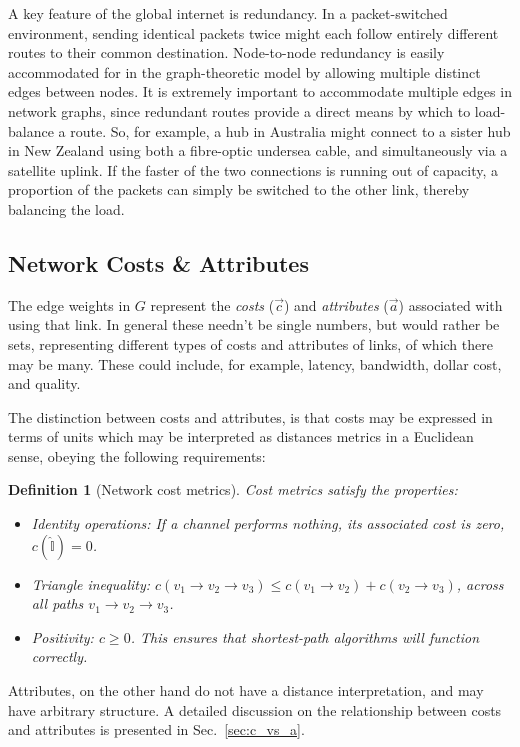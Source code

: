 \documentclass[aps,rmp,twocolumn,amsmath,amssymb,nofootinbib,superscriptaddress]{revtex4}
\newtheorem{definition}{Definition}
\begin{document}
A key feature of the global internet is redundancy. In a packet-switched \cite{???} environment, sending identical packets twice might each follow entirely different routes to their common destination. Node-to-node redundancy is easily accommodated for in the graph-theoretic model by allowing multiple distinct edges between nodes. It is extremely important to accommodate multiple edges in network graphs, since redundant routes provide a direct means by which to load-balance a route. So, for example, a hub in Australia might connect to a sister hub in New Zealand using both a fibre-optic undersea cable, and simultaneously via a satellite uplink. If the faster of the two connections is running out of capacity, a proportion of the packets can simply be switched to the other link, thereby balancing the load.

%
%

\subsection{Network Costs \& Attributes} \label{sec:costs}

The edge weights in $G$ represent the \emph{costs} ($\vec c$) and \emph{attributes} ($\vec a$) associated with using that link. In general these needn't be single numbers, but would rather be sets, representing different types of costs and attributes of links, of which there may be many. These could include, for example, latency, bandwidth, dollar cost, and quality.

The distinction between costs and attributes, is that costs may be expressed in terms of units which may be interpreted as distances metrics in a Euclidean sense, obeying the following requirements:

\begin{definition}[Network cost metrics] \label{def:metric} Cost metrics satisfy the properties:
\begin{itemize}
    \item Identity operations: If a channel performs nothing, its associated cost is zero, \mbox{$c(\mathbb{\hat{I}}) = 0$}.
    \item Triangle inequality: $c(v_1\to v_2\to v_3) \leq c(v_1\to v_2) + c(v_2\to v_3)$, across all paths \mbox{$v_1 \to v_2 \to v_3$}.
    \item Positivity: \mbox{$c\geq 0$}. This ensures that shortest-path algorithms will function correctly.
\end{itemize}
\end{definition}
Attributes, on the other hand do not have a distance interpretation, and may have arbitrary structure. A detailed discussion on the relationship between costs and attributes is presented in Sec.~\ref{sec:c_vs_a}.
\end{document}
